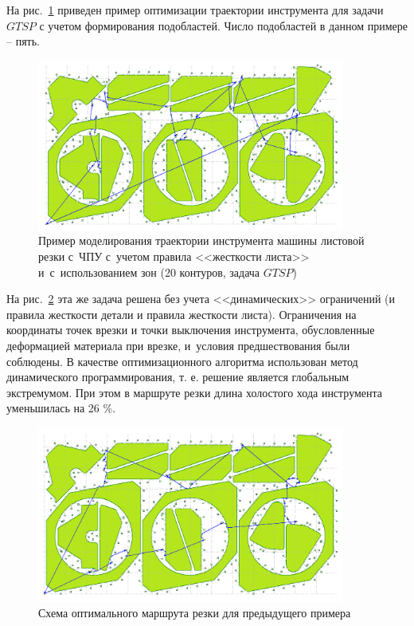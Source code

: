 \documentclass[11pt,twoside,openany]{report}
\begin{document}
На рис.~\ref{zones-a}
приведен пример оптимизации траектории
инструмента для задачи $GTSP$ с учетом
формирования подобластей.
Число подобластей в данном примере -- пять.

\begin{figure}
  \begin{center}
  \includegraphics[width=0.9\textwidth]{zones-a.png}
  \caption{Пример моделирования траектории инструмента машины листовой резки с~ЧПУ
    с~учетом правила <<жесткости листа>> и~с~использованием зон (20 контуров, задача $GTSP$)}
  \label{zones-a}
  \end{center}
\end{figure}

На рис.~\ref{zones-b}
эта же задача решена без учета
<<динамических>> ограничений
(и правила жесткости детали и правила жесткости листа).
Ограничения на координаты точек врезки и
точки выключения инструмента,
обусловленные деформацией материала при врезке,
и~условия предшествования были соблюдены.
В качестве оптимизационного алгоритма
использован метод динамического программирования,
т. е. решение является глобальным экстремумом.
При этом в маршруте резки
длина холостого хода инструмента уменьшилась на 26 \%.

\begin{figure}
  \begin{center}
  \includegraphics[width=0.9\textwidth]{zones-b.png}
  \caption{Схема оптимального маршрута резки для предыдущего примера}
  \label{zones-b}
  \end{center}
\end{figure}
\end{document}
